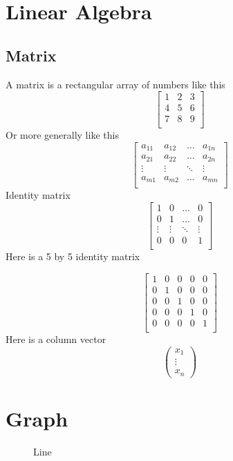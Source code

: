 \documentclass[letterpaper,10pt,twoside,onecolumn,openany,draft]{book}
\begin{document}
\chapter{Linear Algebra}
\section{Matrix}
A matrix is a rectangular array of numbers like this 
\[ 
\begin{bmatrix}
  1 & 2 & 3 \\
  4 & 5 & 6 \\
  7 & 8 & 9 \\
\end{bmatrix}
  \]    
Or more generally like this
\[ 
\begin{bmatrix}
  a_{11} & a_{12} &\ldots & a_{1n} \\
  a_{21} & a_{22} & \ldots & a_{2n} \\
  \vdots & \vdots & \ddots & \vdots \\
  a_{m1} & a_{m 2} & \ldots & a_{mn} \\
\end{bmatrix}
\]
Identity matrix
\[ 
\begin{bmatrix}
  1 & 0 & \ldots & 0 \\
  0 & 1 & \ldots & 0 \\
  \vdots & \vdots & \ddots & \vdots \\
  0 & 0 & 0 & 1 \\
\end{bmatrix}
\]
Here is a 5 by 5 identity matrix 

\[ \begin{bmatrix}
  1 & 0 & 0 &0  &0  \\
  0 & 1 & 0 & 0 & 0 \\
  0 & 0 & 1 & 0 & 0 \\
  0 & 0 & 0 & 1 & 0 \\
  0 & 0 & 0 & 0 & 1 \\
\end{bmatrix}
 \] 
Here is a column vector
\[ \begin{pmatrix} x_1\\ \vdots\\ x_n \end{pmatrix} \] 

\twocolumn

\chapter{Graph}
\begin{figure}[!h]
  \centering
  \caption{Line}
  \label{plot:Line}
\end{figure}
\end{document}
